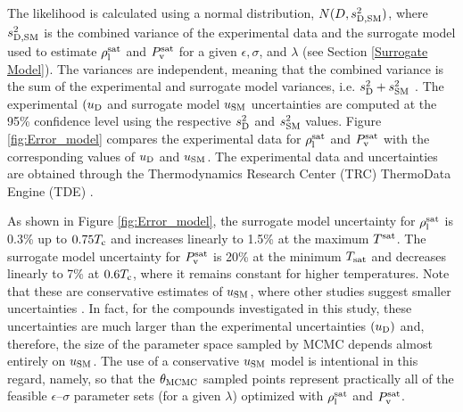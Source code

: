 \documentclass[preprint,letterpaper,floatfix,citeautoscript,aip,jcp]{revtex4-1}
\begin{document}
The likelihood is calculated using a normal distribution, $N(D, s^2_{\rm D,SM})$, where $s^2_{\rm D,SM}$ is the combined variance of the experimental data and the surrogate model used to estimate $\rho_{\rm l}^{\rm sat}$ and $P_{\rm v}^{\rm sat}$ for a given $\epsilon, \sigma$, and $\lambda$ (see Section \ref{Surrogate Model}). The variances 
are independent,
meaning that the combined variance is the sum of the experimental and surrogate model variances, i.e. $s^2_{\rm D} + s^2_{\rm SM}$ \cite{Bay_MD}. The experimental $(u_{\rm D}$ and surrogate model $u_{\rm SM}$ uncertainties are computed at the 95\% confidence level using the respective $s^2_{\rm D}$ and $s^2_{\rm SM}$ values. Figure \ref{fig:Error_model} compares the experimental data for $\rho_{\rm l}^{\rm sat}$ and $P_{\rm v}^{\rm sat}$ with the corresponding values of $u_{\rm D}$ and $u_{\rm SM}$. The experimental data and uncertainties are obtained through the Thermodynamics Research Center (TRC) ThermoData Engine (TDE) \cite{TDE}. 

As shown in Figure \ref{fig:Error_model}, the surrogate model uncertainty for $\rho_{\rm l}^{\rm sat}$ is 0.3\% up to $0.75 T_{\rm c}$ and increases linearly to 1.5\% at the maximum $T^{\rm sat}$. The surrogate model uncertainty for $P_{\rm v}^{\rm sat}$ is 20\% at the minimum $T_{\rm sat}$ and decreases linearly to 7\% at $0.6 T_{\rm c}$, where it remains constant for higher temperatures. Note that these are conservative estimates of $u_{\rm SM}$, where other studies suggest smaller uncertainties \cite{Mostafa_Diss,Mostafa2018,Postdoc_1}. In fact, for the compounds investigated in this study, these uncertainties are much larger than the experimental uncertainties $(u_{\rm D})$ and, therefore, the size of the parameter space sampled by MCMC depends almost entirely on $u_{\rm SM}$. The use of a conservative $u_{\rm SM}$ model is intentional in this regard, namely, so that the $\theta_{\rm MCMC}$ sampled points represent practically all of the feasible $\epsilon$--$\sigma$ parameter sets (for a given $\lambda$) optimized with $\rho_{\rm l}^{\rm sat}$ and $P_{\rm v}^{\rm sat}$. 

\end{document}
